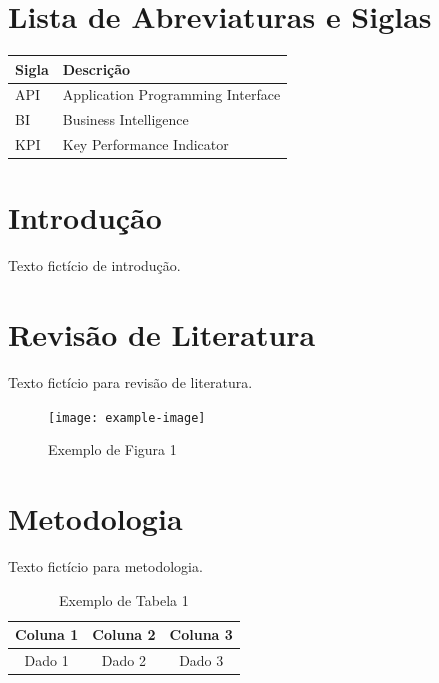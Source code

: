 \documentclass[a4paper,12pt]{report}
\begin{document}
	\chapter*{Lista de Abreviaturas e Siglas}
	\begin{longtable}{p{3cm} p{10cm}}
		\textbf{Sigla} & \textbf{Descrição} \\
		\hline
		API & Application Programming Interface \\
		BI & Business Intelligence \\ 
		KPI & Key Performance Indicator \\
	\end{longtable}
	
	\newpage
	
	\chapter{Introdução}
	Texto fictício de introdução. 
	\lipsum[1-2]
	
	\chapter{Revisão de Literatura}
	Texto fictício para revisão de literatura. 
	\lipsum[3-4]
	
	\begin{figure}[h]
		\centering
		\texttt{[image: example-image]} %
		\caption{Exemplo de Figura 1}
		\label{fig:exemplo1}
	\end{figure}
	
	\chapter{Metodologia}
	Texto fictício para metodologia. 
	\lipsum[5-6]
	
	\begin{table}[h]
		\centering
		\begin{tabular}{|c|c|c|}
			\hline
			Coluna 1 & Coluna 2 & Coluna 3 \\
			\hline
			Dado 1 & Dado 2 & Dado 3 \\
			\hline
		\end{tabular}
		\caption{Exemplo de Tabela 1}
		\label{tab:exemplo1}
	\end{table}
	
\end{document}
